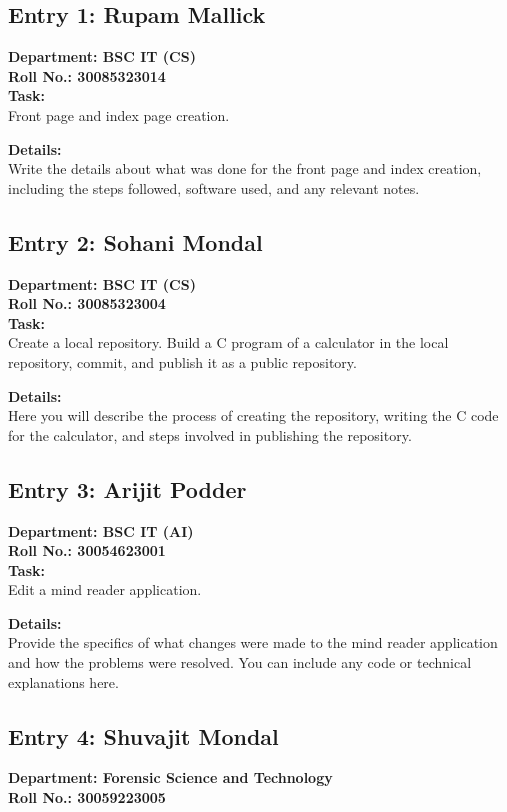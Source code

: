 \documentclass[a4paper,12pt]{article}
\begin{document}
\subsection{Entry 1: Rupam Mallick}
\textbf{Department: BSC IT (CS)} \\
\textbf{Roll No.: 30085323014} \\

\textbf{Task:} \\
Front page and index page creation.

\textbf{Details:} \\
Write the details about what was done for the front page and index creation, including the steps followed, software used, and any relevant notes.

\subsection{Entry 2: Sohani Mondal}
\textbf{Department: BSC IT (CS)} \\
\textbf{Roll No.: 30085323004} \\

\textbf{Task:} \\
Create a local repository. Build a C program of a calculator in the local repository, commit, and publish it as a public repository.

\textbf{Details:} \\
Here you will describe the process of creating the repository, writing the C code for the calculator, and steps involved in publishing the repository.

\subsection{Entry 3: Arijit Podder}
\textbf{Department: BSC IT (AI)} \\
\textbf{Roll No.: 30054623001} \\

\textbf{Task:} \\
Edit a mind reader application.

\textbf{Details:} \\
Provide the specifics of what changes were made to the mind reader application and how the problems were resolved. You can include any code or technical explanations here.

\subsection{Entry 4: Shuvajit Mondal}
\textbf{Department: Forensic Science and Technology} \\
\textbf{Roll No.: 30059223005} \\
\end{document}
